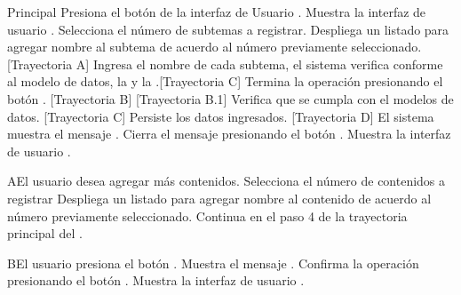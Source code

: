 \begin{UCtrayectoria}{Principal}
    \UCpaso[\UCactor] Presiona el botón  de la interfaz de Usuario .
    \UCpaso Muestra la interfaz de usuario .
    \UCpaso[\UCactor] Selecciona el número de subtemas a registrar.
    \UCpaso Despliega un listado para agregar nombre al subtema de acuerdo al número previamente seleccionado. [Trayectoria A]
    \UCpaso[\UCactor] Ingresa el nombre de cada subtema, el sistema verifica conforme al modelo de datos, la  y la .[Trayectoria C]
	\UCpaso[\UCactor] Termina la operación presionando el botón . [Trayectoria B] [Trayectoria B.1]
	\UCpaso Verifica que se cumpla con el modelos de datos. [Trayectoria C]
	\UCpaso Persiste los datos ingresados. [Trayectoria D]
	\UCpaso El sistema muestra el mensaje .
	\UCpaso[\UCactor] Cierra el mensaje presionando el botón .
	\UCpaso Muestra la interfaz de usuario .
\end{UCtrayectoria}


\begin{UCtrayectoriaA}{A}{El usuario desea agregar más contenidos.}
    \UCpaso[\UCactor] Selecciona el número de contenidos a registrar
    \UCpaso Despliega un listado para agregar nombre al contenido de acuerdo al número previamente seleccionado.
    \UCpaso Continua en el paso 4 de la trayectoria principal del .

\end{UCtrayectoriaA}

\begin{UCtrayectoriaA}{B}{El usuario presiona el botón .}
	\UCpaso Muestra el mensaje .
	\UCpaso[\UCactor] Confirma la operación presionando el botón .
	\UCpaso Muestra la interfaz de usuario .
\end{UCtrayectoriaA}


